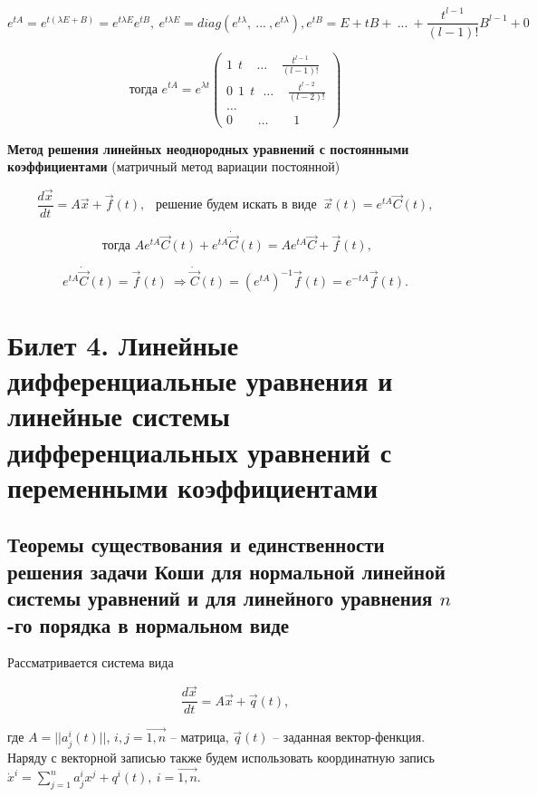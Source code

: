 \[ e^{tA} = e^{t(\lambda E + B)} = e^{t\lambda E}e^{tB},\ e^{t\lambda E} = diag(e^{t\lambda},\ ...\ , e^{t\lambda}), e^{tB} = E + tB +\ ...\ + \frac{t^{l-1}}{(l-1)!}B^{l-1} + 0 \]

\begin{equation*}
	\text{тогда } e^{tA} = e^{\lambda t}
 	\begin{pmatrix}
            1\ \ t\ \ \ \ \  \dots\ \ \ \ \ \frac{t^{l-1}}{(l-1)!} \\
            0\ \ 1\ \ t\ \ \ \dots\ \ \ \ \  \frac{t^{l-2}}{(l-2)!} \\
            \dots \\
            0\ \ \ \ \ \ \ \ \ \dots\ \ \ \ \ \ \ \ \  1
    \end{pmatrix}
\end{equation*}

\textbf{Метод решения линейных неоднородных уравнений с постоянными коэффициентами} (матричный метод вариации постоянной)

\[ \frac{d\vec{x}}{dt} = A\vec{x} + \vec{f}(t),\ \ \text{ решение будем искать в виде } \ \vec{x}(t) = e^{tA}\vec{C}(t), \]

\[ \text{ тогда } Ae^{tA}\vec{C}(t) + e^{tA}\dot{\vec{C}}(t) = Ae^{tA}\vec{C} + \vec{f}(t),\]

\[ e^{tA}\dot{\vec{C}}(t) = \vec{f}(t)\ \Rightarrow \dot{\vec{C}}(t) = (e^{tA})^{-1}\vec{f}(t) = e^{-tA}\vec{f}(t). \]

\newpage

\section{Билет 4. Линейные дифференциальные уравнения и линейные системы дифференциальных уравнений с переменными коэффициентами}

\subsection{Теоремы существования и единственности решения задачи Коши для нормальной линейной системы уравнений и
для линейного уравнения $n$-го порядка в нормальном виде}

Рассматривается система вида 

\begin{equation}
	\frac{d\vec{x}}{dt} = A\vec{x} + \vec{q}(t),
	\label{Issue5_2}
\end{equation} 

где $A = ||a_j^i(t)||$, $i,j = \vec{1,n}$ -- матрица, $\vec{q}(t)$ -- заданная вектор-фенкция. Наряду с векторной записью также будем использовать координатную запись $\dot{x}^i = \sum\limits_{j = 1}^{n} a_j^i x^j + q^i(t),\ i = \vec{1,n}$.

